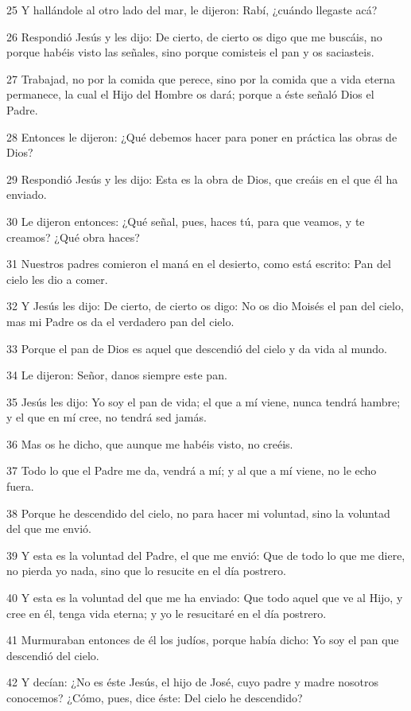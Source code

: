 \par 25 Y hallándole al otro lado del mar, le dijeron: Rabí, ¿cuándo llegaste acá?
\par 26 Respondió Jesús y les dijo: De cierto, de cierto os digo que me buscáis, no porque habéis visto las señales, sino porque comisteis el pan y os saciasteis.
\par 27 Trabajad, no por la comida que perece, sino por la comida que a vida eterna permanece, la cual el Hijo del Hombre os dará; porque a éste señaló Dios el Padre.
\par 28 Entonces le dijeron: ¿Qué debemos hacer para poner en práctica las obras de Dios?
\par 29 Respondió Jesús y les dijo: Esta es la obra de Dios, que creáis en el que él ha enviado.
\par 30 Le dijeron entonces: ¿Qué señal, pues, haces tú, para que veamos, y te creamos? ¿Qué obra haces?
\par 31 Nuestros padres comieron el maná en el desierto, como está escrito: Pan del cielo les dio a comer.
\par 32 Y Jesús les dijo: De cierto, de cierto os digo: No os dio Moisés el pan del cielo, mas mi Padre os da el verdadero pan del cielo.
\par 33 Porque el pan de Dios es aquel que descendió del cielo y da vida al mundo.
\par 34 Le dijeron: Señor, danos siempre este pan.
\par 35 Jesús les dijo: Yo soy el pan de vida; el que a mí viene, nunca tendrá hambre; y el que en mí cree, no tendrá sed jamás.
\par 36 Mas os he dicho, que aunque me habéis visto, no creéis.
\par 37 Todo lo que el Padre me da, vendrá a mí; y al que a mí viene, no le echo fuera.
\par 38 Porque he descendido del cielo, no para hacer mi voluntad, sino la voluntad del que me envió.
\par 39 Y esta es la voluntad del Padre, el que me envió: Que de todo lo que me diere, no pierda yo nada, sino que lo resucite en el día postrero.
\par 40 Y esta es la voluntad del que me ha enviado: Que todo aquel que ve al Hijo, y cree en él, tenga vida eterna; y yo le resucitaré en el día postrero.
\par 41 Murmuraban entonces de él los judíos, porque había dicho: Yo soy el pan que descendió del cielo.
\par 42 Y decían: ¿No es éste Jesús, el hijo de José, cuyo padre y madre nosotros conocemos? ¿Cómo, pues, dice éste: Del cielo he descendido?
